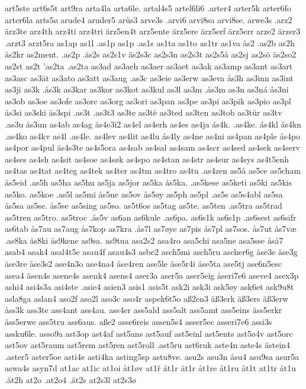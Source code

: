 art5ste
art6s5t
art9ra
arta4la
arta6le.
artal4s5
artel6li6
.arter4
arter5k
arter6fo
arter6la
arts5ø
arude4
aruder5
arůs3
arve3s
.arvi6
arvi8sa
arvi8se.
arwe3s
.arz2
ärz3te
arz4th
arz4ti
arz4tri
ärz5en4t
arz5ente
ärz5ere
ärz5erf
ärz5err
arze2
ärzer3
.arzt3
arzt5ra
as1ap
as1l
.as1p
as1p
.as1s
as1ta
as1to
as1tr
as1va
ås2
.as2b
as2h
äs2kr
as2ment.
.as2p
.äs2s
as2s1v
äs2s3c
as2s3n
as2s3t
as2s5å
as2sj
as2sö
äs2so2
as2st
as2t
'as2ta
.as2ta
as3ad
as3aeh
as3aer
as3aet
as3ak
as3amp
as3ant
as3art
as3asc
as3ät
as3ato
as3att
as3aug
.as3c
as3eie
as3erw
as3eva
ås3h
as3inn
as3int
as3ji
as3k
.ås3k
as3kar
as3kor
as3kot
as3kul
as3l
as3m
.ås3m
as3n
as3ná
ås3ni
as3ob
as3oe
as3ofe
as3orc
as3org
as3ori
as3pan
as3pe
as3pi
as3pik
as3pio
as3pl
ås3si
as3ski
äs3spi
.as3t
.as3t3
as3te
as3tè
as3ted
as3ten
as3tob
as3tür
as3tv
.as3u
ås3un
as4ab
as4ag
äs4e3i2
as4el
as4erh
as4es
as4ja
ás4k.
.as4ke.
ás4kl
ás4kn
.as4ko
as4kv
as4l
.as4le.
as4lev
as4lit
as4lu
ás4ly
as4ne
as4ni
as4pan
as4ple
ás4po
as4por
as4pul
äs4s3te
as4s5ora
as4sab
as4sal
as4sam
as4scr
as4sed
as4sek
as4serv
as4ses
as4sh
as4sit
as4soe
as4søk
as4spo
as4stan
as4str
as4sur
as4sys
as4t5enh
as4tas
as4tat
as4teg
as4tek
as4ter
as4tm
as4tro
as4tu
.as4zen
as5å
as5ce
as5cham
ås5eid
.as5h
as5ha
as5hu
as5ja
as5jor
as5ka
ås5ka.
.as5kese
as5keti
as5ki
as5kis
as5ko.
as5koe
.as5l
as5mi
ås5ne
as5ov
ås5øy
as5ph
as5pl
.as5s
as5s4abl
as5sa
ås5sa
as5se.
ås5se
as5sing
as5so.
as5t6os
as5tag
as5te.
as5ten
.as5tra
as5trad
as5tren
as5tro.
as5troc
.ås5v
as6an
as6kule
.as6pa.
as6s1k
as6s1p
.as6sest
as6sifr
as6tab
ås7au
as7aug
ås7kop
as7kra
.ås7l
as7øye
as7pis
ås7pl
as7sos.
ås7ut
ås7væ
.as8ka
ås8ki
ås9kene
as9sa.
as9tua
asa2s2
asa4ro
asa5chi
asa5ne
asa5sse
åså7
asab4
asak4
asal4t5e
asau4f
asau4s3
asbe2
asch5mi
asch5ru
ascher6g
äse3e
äse3g
äse3re
åse3s2
ase4n3o
ase4na4
äse4ren
ase5le
äse5r4i
åse5ta
ase5tj
ase6n5esc
asea4
äsen4s
asene4s
asenk4
asens4
aser3a
aser5a
aser5eig
åseri7e6
aseve4
asex3p
ashi4
asi4s3a
asi4ste
.asie4
asien3
asis1
asis5t
ask2i
ask3i
ask5øy
ask6et
ask9u8t
asla8ga
aslan4
aso2f
aso2l
aso3c
aso4r
aspek6t5o
aß2en3
äß3erk
äß3ers
äß3erw
åss3k
ass3te
ass4ant
ass4au.
ass4er
ass5ald
ass5alt
ass5amt
ass5eins
äss5erkr
äss5erwe
ass5tru
ass6aus.
aße2
asse6reis
assen5s4
asser5ec
asseri7e6
assi3s
assku6le.
asso9a
ast3op
ast4af
ast5ans
ast5auf
ast5einl
ast5ents
ast5ø4v
ast5orc
ast5ov
ast5raum
ast5rem
ast5ren
ast5roll
.ast5ru
ast6ruk
aste4n
aste4s
ästein4
.aster5
aster5oe
asti4e
asti4ka
asting5sp
astu8ve.
asu2s
asu3n
åsu4
asu9sa
asur5a
aswa4s
asyn7d
at1ac
at1ic
at1oi
åt1øv
at1ř
át1r
ät1r
åt1re
åt1ru
åt1t
at1tr
åt1u
.ät2h
at2o
.at2o4
.ät2s
at2s3l
at2s3ø
